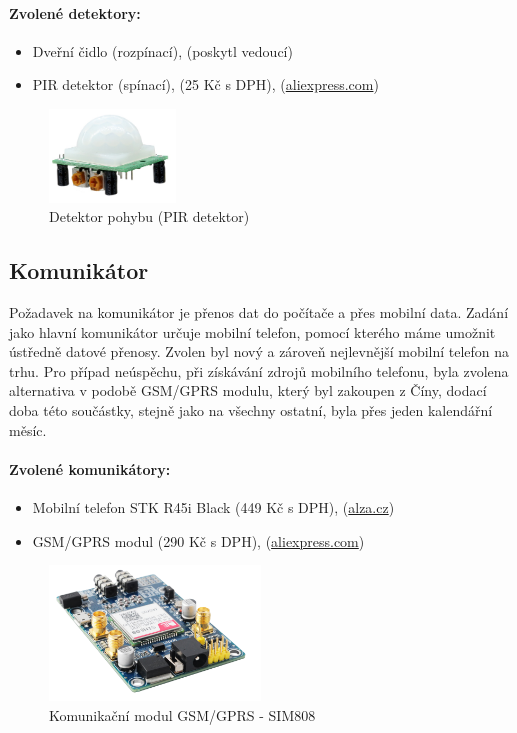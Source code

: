 \documentclass[FM,DP]{tulthesis}  %
\begin{document}
\paragraph{Zvolené detektory:}
\begin{itemize}
\item Dveřní čidlo (rozpínací), (poskytl vedoucí)
\item PIR detektor (spínací), (25 Kč s DPH), (\url{aliexpress.com})
\end{itemize} 

\begin{figure}[H]
\begin{center}
\includegraphics[width=0.3\textwidth]{images/PIR.jpg}
\caption{Detektor pohybu (PIR detektor)}
\label{image}
\end{center}
\end{figure}

\subsection{Komunikátor}
Požadavek na komunikátor je přenos dat do počítače a přes mobilní data. Zadání jako hlavní komunikátor určuje mobilní telefon, pomocí kterého máme umožnit ústředně datové přenosy. Zvolen byl nový a zároveň nejlevnější mobilní telefon na trhu. Pro případ neúspěchu, při získávání zdrojů mobilního telefonu, byla zvolena alternativa v podobě GSM/GPRS modulu, který byl zakoupen z Číny, dodací doba této součástky, stejně jako na všechny ostatní, byla přes jeden kalendářní měsíc.

\paragraph{Zvolené komunikátory:}
\begin{itemize}
\item Mobilní telefon STK R45i Black (449 Kč s DPH), (\url{alza.cz})
\item GSM/GPRS modul (290 Kč s DPH), (\url{aliexpress.com})
\end{itemize} 

\begin{figure}[H]
\begin{center}
\includegraphics[width=0.5\textwidth]{images/gprs.png}
\caption{Komunikační modul GSM/GPRS - SIM808}
\label{image}
\end{center}
\end{figure}
\end{document}
